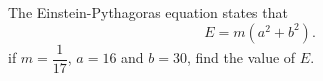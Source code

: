 The Einstein-Pythagoras equation states that $$E=m\left(a^2+b^2\right).$$if $m=\dfrac{1}{17}$, $a=16$ and $b=30$, find the value of $E$.
